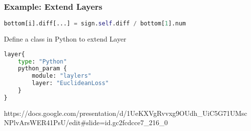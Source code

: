 
\begin{frame}[fragile]
  \MyLogo
  \frametitle{Example: Extend Layers}  
  
\ContinueLineNumber
\begin{lstlisting}[language=python]
			bottom[i].diff[...] = sign.self.diff / bottom[1].num
\end{lstlisting}

Define a class in Python to extend Layer
\begin{lstlisting}[language=python]
layer{
	type: "Python"
	python_param {
		module: "laylers"
		layer: "EuclideanLoss"
	}
}
\end{lstlisting}

\vskip 110pt

\tiny
\begin{center}
{
\color{red}https://docs.google.com/presentation/d/1UeKXVgRvvxg9OUdh\_UiC5G71UMscNPlvArsWER41PsU/edit\#slide=id.gc2fcdcce7\_216\_0
}
\end{center}
\end{frame}